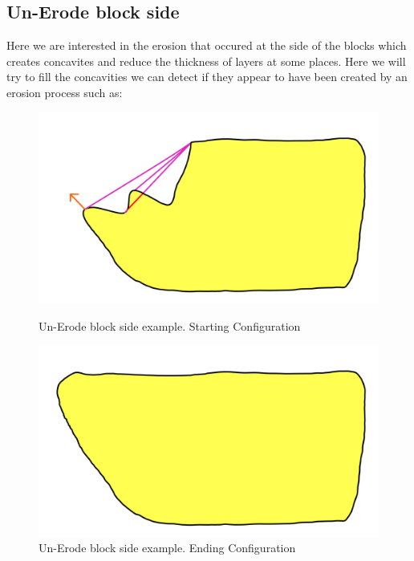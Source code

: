 \documentclass[12pt, a4paper]{report} %
\begin{document}
\subsection{Un-Erode block side}

Here we are interested in the erosion that occured at the side of the blocks which creates concavites and reduce the thickness of layers at some places. Here we will try to fill the concavities we can detect if they appear to have been created by an erosion process such as:
\begin{figure}[h]
    \begin{minipage}[c]{.46\linewidth}
        \centering
        \includegraphics[scale=0.2]{unErodeSideDescription0.png}
	\caption{Un-Erode block side example. Starting Configuration}
    \end{minipage}
    \hfill%
    \begin{minipage}[c]{.46\linewidth}
        \centering
        \includegraphics[scale=0.2]{unErodeSideDescription1.png}
	\caption{Un-Erode block side example. Ending Configuration}
    \end{minipage}
\end{figure}\\
\end{document}
